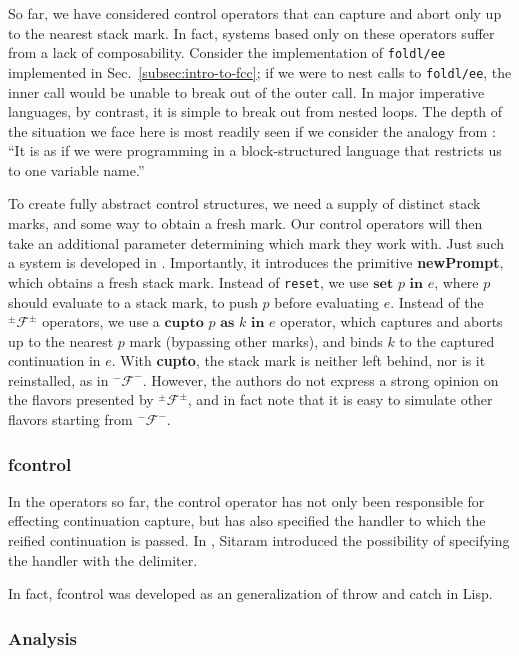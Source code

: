 \documentclass[11pt]{article}
\newcommand\F{\mathcal{F}}
\newcommand\pmFpm{^\pm\F^\pm}
\begin{document}
So far, we have considered control operators that can capture and abort only up to the nearest stack mark.
In fact, systems based only on these operators suffer from a lack of composability.
Consider the implementation of \texttt{foldl/ee} implemented in Sec.~\ref{subsec:intro-to-fcc}; if we were to nest calls to \texttt{foldl/ee}, the inner call would be unable to break out of the outer call.
In major imperative languages, by contrast, it is simple to break out from nested loops.
The depth of the situation we face here is most readily seen if we consider the analogy from \cite{ContinuationsAndConcurrency}: ``It is as if we were programming in a block-structured language that restricts us to one variable name.''

To create fully abstract control structures, we need a supply of distinct stack marks, and some way to obtain a fresh mark.
Our control operators will then take an additional parameter determining which mark they work with.
Just such a system is developed in \cite{Gunter:1995}.
Importantly, it introduces the primitive \textbf{newPrompt}, which obtains a fresh stack mark.
Instead of \texttt{reset}, we use $\textbf{set }p\textbf{ in }e$, where $p$ should evaluate to a stack mark, to push $p$ before evaluating $e$.
Instead of the $\pmFpm$ operators, we use a $\textbf{cupto }p\textbf{ as }k\textbf{ in }e$ operator, which captures and aborts up to the nearest $p$ mark (bypassing other marks), and binds $k$ to the captured continuation in $e$.
With \textbf{cupto}, the stack mark is neither left behind, nor is it reinstalled, as in $^-\mathcal{F}^-$.
However, the authors do not express a strong opinion on the flavors presented by $\pmFpm$, and in fact note that it is easy to simulate other flavors starting from $^-\mathcal{F}^-$.

\subsubsection{fcontrol}

In the operators so far, the control operator has not only been responsible for effecting continuation capture, but has also specified the handler to which the reified continuation is passed.
In \cite{HandlingControl}, Sitaram introduced the possibility of specifying the handler with the delimiter.


In fact, fcontrol was developed as an generalization of throw and catch in Lisp.

\subsubsection{Analysis}
\end{document}
